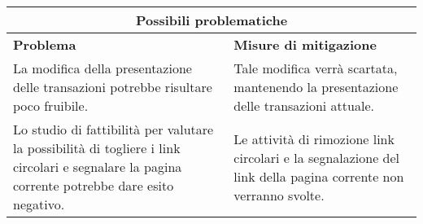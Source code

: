 \documentclass[a4paper, 12pt]{article}
\begin{document}
\begin{center}
    \begin{tabularx}{\textwidth}{|X|X|}
        \hline
        \multicolumn{2}{|c|}{\textbf{Possibili problematiche}}\\
        \hline
        \hline
        \textbf{Problema} & \textbf{Misure di mitigazione}\\
        \hline
        La modifica della presentazione delle transazioni potrebbe risultare poco fruibile. & Tale modifica verrà scartata, mantenendo la presentazione delle transazioni attuale.\\
        \hline
        Lo studio di fattibilità per valutare la possibilità di togliere i link circolari e segnalare la pagina corrente potrebbe dare esito negativo. & Le attività di rimozione link circolari e la segnalazione del link della pagina corrente non verranno svolte.\\
        \hline
    \end{tabularx}\\[8pt]
    \mbox{}\\
\end{center}
\end{document}
